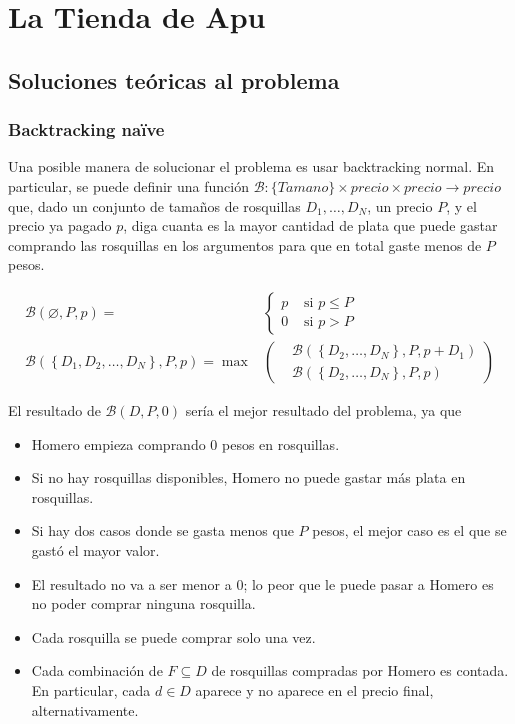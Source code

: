 \newpage{}
\section{La Tienda de Apu}

\subsection{Soluciones teóricas al problema}

\subsubsection{Backtracking na\"ive}

Una posible manera de solucionar el problema es usar backtracking normal. En particular, se puede definir una función \( \mathcal{B} : \{Tamano\} \times precio \times precio \rightarrow precio \) que, dado un conjunto de tamaños de rosquillas \( D_1, \ldots, D_N \), un precio \( P \), y el precio ya pagado  \( p \), diga cuanta es la mayor cantidad de plata que puede gastar comprando las rosquillas en los argumentos para que en total gaste menos de \( P \) pesos.

\begin{align*}
\mathcal{B} (\varnothing, P, p) =
	&\begin{cases}
		p & \text{ si \(p \leq P\)} \\
		0 & \text{ si \(p > P\)}
	\end{cases} \\
\mathcal{B} \left( \left\{ D_1, D_2, \ldots, D_N \right\}, P, p \right) = \max &\left(
	\begin{aligned}
		&\mathcal{B} \left( \left\{ D_2, \ldots, D_N \right\}, P, p + D_1 \right) \\
		&\mathcal{B} \left( \left\{ D_2, \ldots, D_N \right\}, P, p \right)
	\end{aligned}
	\right)
\end{align*}

El resultado de \( \mathcal{B}(D, P, 0) \) sería el mejor resultado del problema, ya que

\begin{itemize}
	\item Homero empieza comprando 0 pesos en rosquillas.
	\item Si no hay rosquillas disponibles, Homero no puede gastar más plata en rosquillas.
	\item Si hay dos casos donde se gasta menos que \( P \) pesos, el mejor caso es el que se gastó el mayor valor.
	\item El resultado no va a ser menor a 0; lo peor que le puede pasar a Homero es no poder comprar ninguna rosquilla.
	\item Cada rosquilla se puede comprar solo una vez.
	\item Cada combinación de \( F \subseteq D \) de rosquillas compradas por Homero es contada. En particular, cada \( d \in D \) aparece y no aparece en el precio final, alternativamente.
\end{itemize}

